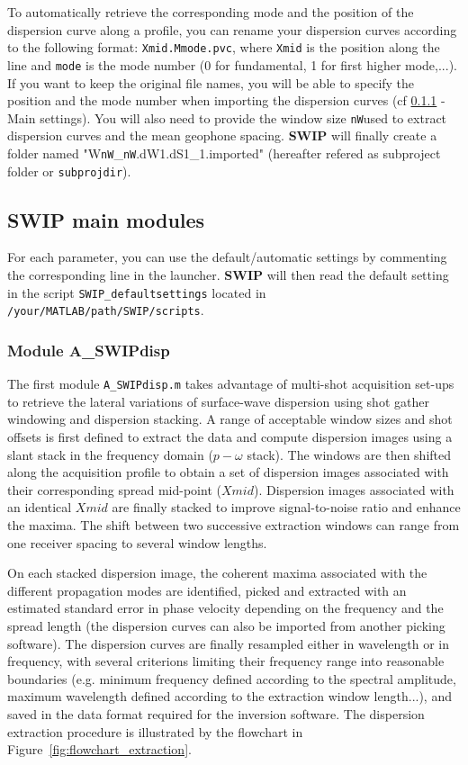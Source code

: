 \documentclass[twoside,a4paper]{article}
\def\SWIP{\textbf{SWIP}}
\begin{document}
To automatically retrieve the corresponding mode and the position of the dispersion curve along a profile, you can rename your dispersion curves according to the following format: \verb|Xmid.Mmode.pvc|, where \verb|Xmid| is the position along the line and \verb|mode| is the mode number (0 for fundamental, 1 for first higher mode,...). If you want to keep the original file names, you will be able to specify the position and the mode number when importing the dispersion curves (cf \ref{sec:moduleA} - Main settings). You will also need to provide the window size \verb|nW|used to extract dispersion curves and the mean geophone spacing. {\SWIP} will finally create a folder named "W\verb|nW|\_\verb|nW|.dW1.dS1\_1.imported" (hereafter refered as subproject folder or \verb|subprojdir|).

\subsection{SWIP main modules}
For each parameter, you can use the default/automatic settings by commenting the corresponding line in the launcher. {\SWIP} will then read the default setting in the script \verb|SWIP_defaultsettings| located in \verb|/your/MATLAB/path/SWIP/scripts|.

\subsubsection{Module A\_SWIPdisp}
\label{sec:moduleA}
The first module \verb|A_SWIPdisp.m| takes advantage of multi-shot acquisition set-ups to retrieve the lateral variations of surface-wave dispersion using shot gather windowing and dispersion stacking. A range of acceptable window sizes and shot offsets is first defined to extract the data and compute dispersion images using a slant stack in the frequency domain ($p-\omega$ stack). The windows are then shifted along the acquisition profile to obtain a set of dispersion images associated with their corresponding spread mid-point ($Xmid$). Dispersion images associated with an identical $Xmid$ are finally stacked to improve signal-to-noise ratio and enhance the maxima. The shift between two successive extraction windows can range from one receiver spacing to several window lengths.

On each stacked dispersion image, the coherent maxima associated with the different propagation modes are identified, picked and extracted with an estimated standard error in phase velocity depending on the frequency and the spread length (the dispersion curves can also be imported from another picking software). The dispersion curves are finally resampled either in wavelength or in frequency, with several criterions limiting their frequency range into reasonable boundaries (e.g. minimum frequency defined according to the spectral amplitude, maximum wavelength defined according to the extraction window length...), and saved in the data format required for the inversion software. The dispersion extraction procedure is illustrated by the flowchart in Figure~\ref{fig:flowchart_extraction}.
\end{document}
